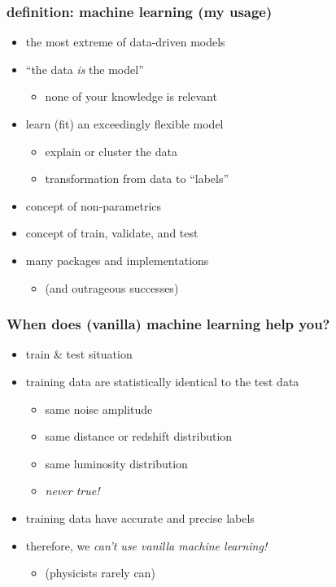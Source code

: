 \documentclass[pdftex]{beamer}
\begin{document}
\begin{frame}
  \frametitle{definition: machine learning (my usage)}
  \begin{itemize}
  \item the most extreme of data-driven models
  \item ``the data \emph{is} the model''
    \begin{itemize}
    \item none of your knowledge is relevant
    \end{itemize}
  \item learn (fit) an exceedingly flexible model
    \begin{itemize}
    \item explain or cluster the data
    \item transformation from data to ``labels''
    \end{itemize}
  \item concept of non-parametrics
  \item concept of train, validate, and test
  \item many packages and implementations
    \begin{itemize}
    \item (and outrageous successes)
    \end{itemize}
  \end{itemize}
\end{frame}

\begin{frame}
  \frametitle{When does (vanilla) machine learning help you?}
  \begin{itemize}
  \item train \& test situation
  \item training data are statistically identical to the test data
    \begin{itemize}
    \item same noise amplitude
    \item same distance or redshift distribution
    \item same luminosity distribution
    \item \emph{never true!}
    \end{itemize}
  \item training data have accurate and precise labels
  \item therefore, we \emph{can't use vanilla machine learning!}
    \begin{itemize}
    \item (physicists rarely can)
    \end{itemize}
  \end{itemize}
\end{frame}
\end{document}
